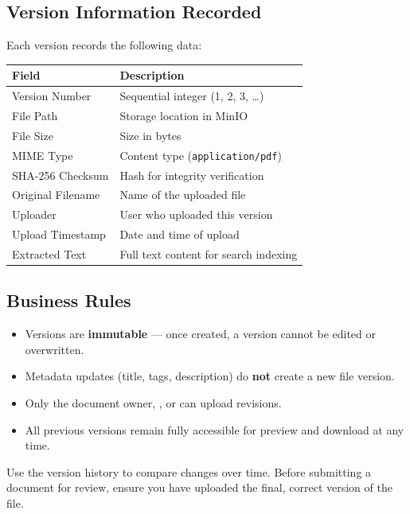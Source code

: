 \subsection{Version Information Recorded}

Each version records the following data:

\begin{tabularx}{\textwidth}{@{} l X @{}}
  \toprule
  \textbf{Field} & \textbf{Description} \\
  \midrule
  Version Number    & Sequential integer (1, 2, 3, \ldots) \\
  File Path         & Storage location in MinIO \\
  File Size         & Size in bytes \\
  MIME Type         & Content type (\texttt{application/pdf}) \\
  SHA-256 Checksum  & Hash for integrity verification \\
  Original Filename & Name of the uploaded file \\
  Uploader          & User who uploaded this version \\
  Upload Timestamp  & Date and time of upload \\
  Extracted Text    & Full text content for search indexing \\
  \bottomrule
\end{tabularx}

\subsection{Business Rules}
\begin{itemize}[leftmargin=18pt]
  \item Versions are \textbf{immutable} --- once created, a
        version cannot be edited or overwritten.
  \item Metadata updates (title, tags, description) do
        \textbf{not} create a new file version.
  \item Only the document owner, , or
         can upload revisions.
  \item All previous versions remain fully accessible for
        preview and download at any time.
\end{itemize}

\begin{ugTip}
  Use the version history to compare changes over time.
  Before submitting a document for review, ensure you have
  uploaded the final, correct version of the file.
\end{ugTip}

\newpage
